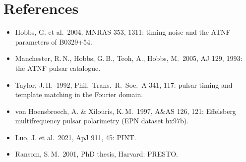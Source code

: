 \documentclass[11pt,a4paper]{article}
\newcommand{\psr}{B0329+54}
\begin{document}
\section*{References}
\begin{itemize}
\item Hobbs, G. et al.\ 2004, MNRAS 353, 1311: timing noise and the ATNF parameters of \psr{}.
\item Manchester, R.\,N., Hobbs, G.\,B., Teoh, A., Hobbs, M.\ 2005, AJ 129, 1993: the ATNF pulsar catalogue.
\item Taylor, J.\,H.\ 1992, Phil.\ Trans.\ R.\ Soc.\ A 341, 117: pulsar timing and template matching in the Fourier domain.
\item von Hoensbroech, A. \& Xilouris, K.\,M.\ 1997, A\&AS 126, 121: Effelsberg multifrequency pulsar polarimetry (EPN dataset hx97b).
\item Luo, J. et al.\ 2021, ApJ 911, 45: PINT.
\item Ransom, S.\,M.\ 2001, PhD thesis, Harvard: PRESTO.
\end{itemize}
\end{document}
